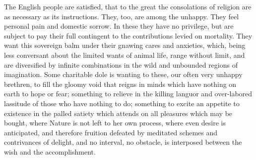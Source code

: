 The English people are satisfied, that to the great the consolations of religion are as necessary as its instructions. They, too, are among the unhappy. They feel personal pain and domestic sorrow. In these they have no privilege, but are subject to pay their full contingent to the contributions levied on mortality. They want this sovereign balm under their gnawing cares and anxieties, which, being less conversant about the limited wants of animal life, range without limit, and are diversified by infinite combinations in the wild and unbounded regions of imagination. Some charitable dole is wanting to these, our often very unhappy brethren, to fill the gloomy void that reigns in minds which have nothing on earth to hope or fear; something to relieve in the killing languor and over-labored lassitude of those who have nothing to do; something to excite an appetite to existence in the palled satiety which attends on all pleasures which may be bought, where Nature is not left to her own process, where even desire is anticipated, and therefore fruition defeated by meditated schemes and contrivances of delight, and no interval, no obstacle, is interposed between the wish and the accomplishment.

